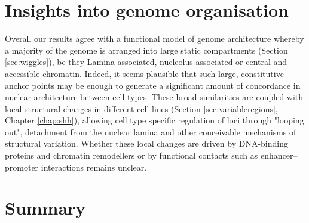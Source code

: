\documentclass[a4paper,11pt,oneside]{book}
\begin{document}
\section{Insights into genome organisation}


Overall our results agree with a functional model of genome architecture whereby a majority of the genome is arranged into large static compartments (Section \ref{sec:wiggles}), be they Lamina associated, nucleolus associated or central and accessible chromatin. Indeed, it seems plausible that such large, constitutive anchor points may be enough to generate a significant amount of concordance in nuclear architecture between cell types.\cite{Bouwman2015a} These broad similarities are coupled with local structural changes in different cell lines (Section \ref{sec:variableregions}, Chapter \ref{chap:shh}), allowing cell type specific regulation of loci through "looping out", detachment from the nuclear lamina and other conceivable mechanisms of structural variation. Whether these local changes are driven by DNA-binding proteins and chromatin remodellers or by functional contacts such as enhancer--promoter interactions remains unclear.

\section{Summary}



\end{document}
